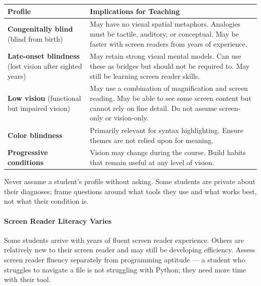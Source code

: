 \documentclass[
  justified,
  openright,
]{tufte-book}
\let\subsubsection\paragraph
\let\paragraph\paragraph
\let\subsubsection\paragraph
\let\paragraph\paragraph
\begin{document}
{\def\LTcaptype{none} %
\begin{longtable}[]{@{}
  >{\raggedright\arraybackslash}p{}
  >{\raggedright\arraybackslash}p{}@{}}
\toprule\noalign{}
\begin{minipage}[b]{\linewidth}\raggedright
Profile
\end{minipage} & \begin{minipage}[b]{\linewidth}\raggedright
Implications for Teaching
\end{minipage} \\
\midrule\noalign{}
\endhead
\bottomrule\noalign{}
\endlastfoot
\textbf{Congenitally blind} (blind from birth) & May have no visual
spatial metaphors. Analogies must be tactile, auditory, or conceptual.
May be faster with screen readers from years of experience. \\
\textbf{Late-onset blindness} (lost vision after sighted years) & May
retain strong visual mental models. Can use these as bridges but should
not be required to. May still be learning screen reader skills. \\
\textbf{Low vision} (functional but impaired vision) & May use a
combination of magnification and screen reading. May be able to see some
screen content but cannot rely on fine detail. Do not assume screen-only
or vision-only. \\
\textbf{Color blindness} & Primarily relevant for syntax highlighting.
Ensure themes are not relied upon for meaning. \\
\textbf{Progressive conditions} & Vision may change during the course.
Build habits that remain useful at any level of vision. \\
\end{longtable}
}

Never assume a student's profile without asking. Some students are
private about their diagnoses; frame questions around what tools they
use and what works best, not what their condition is.

\subsubsection{Screen Reader Literacy
Varies}\label{screen-reader-literacy-varies}

Some students arrive with years of fluent screen reader experience.
Others are relatively new to their screen reader and may still be
developing efficiency. Assess screen reader fluency separately from
programming aptitude --- a student who struggles to navigate a file is
not struggling with Python; they need more time with their tool.
\end{document}
